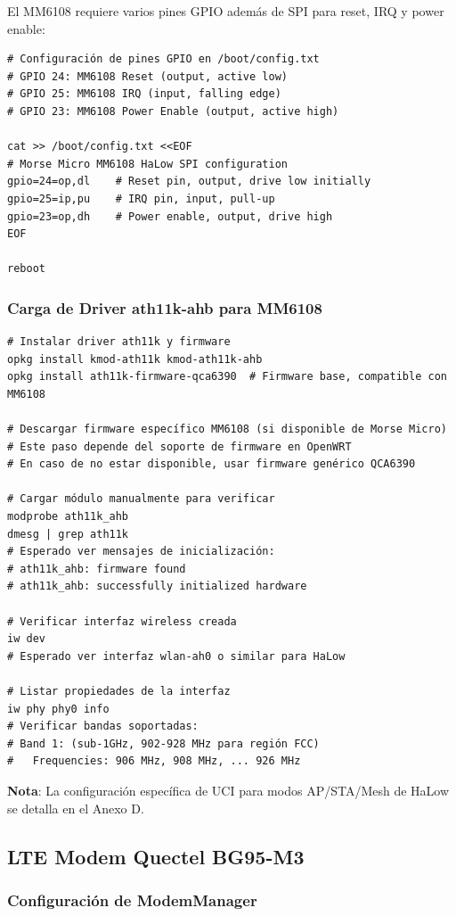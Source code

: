 El MM6108 requiere varios pines GPIO además de SPI para reset, IRQ y power enable:

\begin{verbatim}
# Configuración de pines GPIO en /boot/config.txt
# GPIO 24: MM6108 Reset (output, active low)
# GPIO 25: MM6108 IRQ (input, falling edge)
# GPIO 23: MM6108 Power Enable (output, active high)

cat >> /boot/config.txt <<EOF
# Morse Micro MM6108 HaLow SPI configuration
gpio=24=op,dl    # Reset pin, output, drive low initially
gpio=25=ip,pu    # IRQ pin, input, pull-up
gpio=23=op,dh    # Power enable, output, drive high
EOF

reboot
\end{verbatim}

\subsubsection{Carga de Driver ath11k-ahb para MM6108}

\begin{verbatim}
# Instalar driver ath11k y firmware
opkg install kmod-ath11k kmod-ath11k-ahb
opkg install ath11k-firmware-qca6390  # Firmware base, compatible con MM6108

# Descargar firmware específico MM6108 (si disponible de Morse Micro)
# Este paso depende del soporte de firmware en OpenWRT
# En caso de no estar disponible, usar firmware genérico QCA6390

# Cargar módulo manualmente para verificar
modprobe ath11k_ahb
dmesg | grep ath11k
# Esperado ver mensajes de inicialización:
# ath11k_ahb: firmware found
# ath11k_ahb: successfully initialized hardware

# Verificar interfaz wireless creada
iw dev
# Esperado ver interfaz wlan-ah0 o similar para HaLow

# Listar propiedades de la interfaz
iw phy phy0 info
# Verificar bandas soportadas:
# Band 1: (sub-1GHz, 902-928 MHz para región FCC)
#   Frequencies: 906 MHz, 908 MHz, ... 926 MHz
\end{verbatim}

\textbf{Nota}: La configuración específica de UCI para modos AP/STA/Mesh de HaLow se detalla en el Anexo D.

\subsection{LTE Modem Quectel BG95-M3}

\subsubsection{Configuración de ModemManager}

